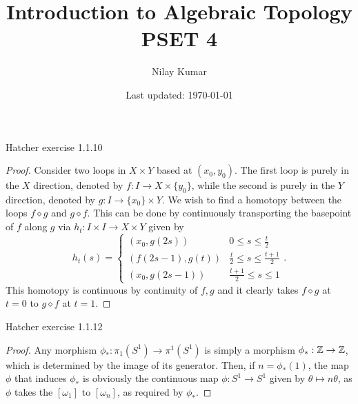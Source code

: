 \documentclass{../../mathnotes}
\title{Introduction to Algebraic Topology PSET 4}
\author{Nilay Kumar}
\date{Last updated: \today}
\begin{document}
\maketitle

\begin{prop}
    Hatcher exercise 1.1.10
\end{prop}
\begin{proof}
    Consider two loops in $X\times Y$ based at $(x_0,y_0)$. The first loop is purely in the $X$
    direction, denoted by $f:I\to X\times\{y_0\}$, while the second is purely in the $Y$ direction,
    denoted by $g:I\to \{x_0\}\times Y$. We wish to find a homotopy between the loops
    $f\diamond g$ and $g\diamond f$. This can be done by continuously transporting the 
    basepoint of $f$ along $g$ via $h_t:I\times I\to X\times Y$ given by
    \[
        h_t(s)=
        \begin{cases}
            (x_0, g(2s)) & 0\leq s \leq \frac{t}{2}\\
            (f(2s-1), g(t)) & \frac{t}{2} \leq s \leq \frac{t+1}{2}\\
            (x_0, g(2s-1)) & \frac{t+1}{2} \leq s \leq 1
        \end{cases}.
        \]
    This homotopy is continuous by continuity of $f,g$ and it clearly takes
    $f\diamond g$ at $t=0$ to $g\diamond f$ at $t=1$.
\end{proof}

\begin{prop}
    Hatcher exercise 1.1.12
\end{prop}
\begin{proof}
    Any morphism $\phi_*:\pi_1(S^1)\to\pi^1(S^1)$ is simply a morphism $\phi_*:\mathbb{Z}\to\mathbb{Z}$, which
    is determined by the image of its generator. Then, if $n=\phi_*(1)$, the map $\phi$ that
    induces $\phi_*$ is obviously the continuous map $\phi:S^1\to S^1$ given by
    $\theta\mapsto n\theta$, as $\phi$ takes the $[\omega_1]$ to $[\omega_n]$, as required
    by $\phi_*$.
\end{proof}
\end{document}

